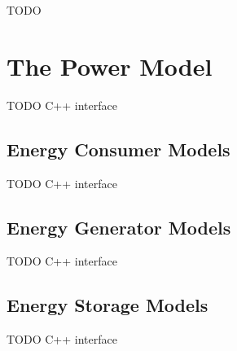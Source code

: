 \ifdraft TODO

\chapter{The Power Model}
\label{cha:power}

TODO C++ interface

\section{Energy Consumer Models}

TODO C++ interface
 
\section{Energy Generator Models}

TODO C++ interface

\section{Energy Storage Models}

TODO C++ interface

\fi


